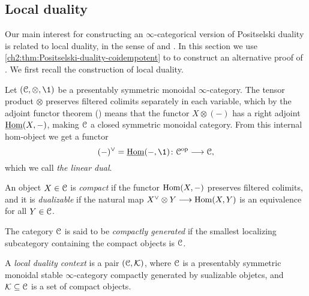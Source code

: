 

\subsection{Local duality}
\label{ch2:ssec:local-duality}

Our main interest for constructing an $\infty$-categorical version of Positselski duality is related to local duality, in the sense of \cite{hovey-palmiery-strickland_97} and \cite{barthel-heard-valenzuela_2018}. In this section we use \cref{ch2:thm:Positselski-duality-coidempotent} to to construct an alternative proof of \cite[2.21]{barthel-heard-valenzuela_2018}. We first recall the construction of local duality.

Let $(\C, \otimes, \1)$ be a presentably symmetric monoidal $\infty$-category. The tensor product $\otimes$ preserves filtered colimits separately in each variable, which by the adjoint functor theorem (\cite[5.5.2.9]{lurie_09}) means that the functor $X\otimes (-)$ has a right adjoint $\operatorname{\underline{Hom}}(X, -)$, making $\EuScript{C}$ a closed symmetric monoidal category. From this internal hom-object we get a functor 
\[(-)^\vee = \iHom(-, \1)\: \C\op \to \C,\] 
which we call \emph{the linear dual}. 

\begin{definition}
    An object $X\in \EuScript{C}$ is \emph{compact} if the functor $\operatorname{Hom}(X, -)$ preserves filtered colimits, and it is \emph{dualizable} if the natural map $X^\vee \otimes Y \longrightarrow \operatorname{Hom}(X,Y)$ is an equivalence for all $Y\in \EuScript{C}$. 
\end{definition}

The category $\EuScript{C}$ is said to be \emph{compactly generated} if the smallest localizing subcategory containing the compact objects is $\EuScript{C}$. 

\begin{definition}
    A \emph{local duality context} is a pair $(\EuScript{C}, \mathcal{K})$, where $\EuScript{C}$ is a presentably symmetric monoidal stable $\infty$-category compactly generated by sualizable objetcs, and $\mathcal{K}\subseteq \EuScript{C}$ is a set of compact objects. 
\end{definition}

